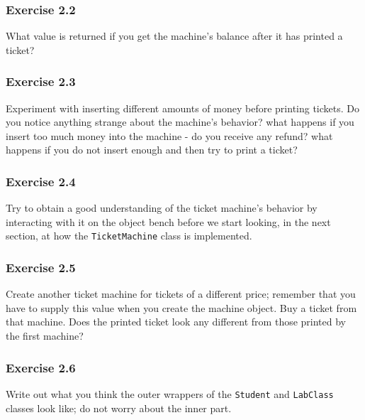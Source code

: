 \subsubsection{Exercise 2.2}
What value is returned if you get the machine's balance after it has printed a 
ticket? 

\subsubsection{Exercise 2.3}
Experiment with inserting different amounts of money before printing tickets. 
Do you notice anything strange about the machine's behavior? what happens if 
you insert too much money into the machine - do you receive any refund? what 
happens if you do not insert enough and then try to print a ticket? 

\subsubsection{Exercise 2.4}
Try to obtain a good understanding of the ticket machine's behavior by 
interacting with it on the object bench before we start looking, in the next 
section, at how the \verb?TicketMachine? class is implemented. 

\subsubsection{Exercise 2.5}
Create another ticket machine for tickets of a different price; remember that 
you have to supply this value when you create the machine object. Buy a ticket 
from that machine. Does the printed ticket look any different from those 
printed by the first machine? 

\subsubsection{Exercise 2.6}
Write out what you think the outer wrappers of the \verb?Student? and 
\verb?LabClass? classes look like; do not worry about the inner part. 

